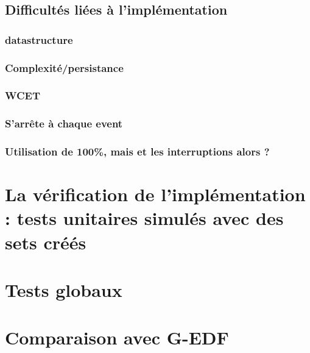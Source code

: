 		
		

\subsection{Difficultés liées à l'implémentation}
	\subsubsection{datastructure}
	\subsubsection{Complexité/persistance}
	\subsubsection{WCET}
	\subsubsection{S'arrête à chaque event}
	\subsubsection{Utilisation de 100\%, mais et les interruptions alors ?}

\section{La vérification de l'implémentation : tests unitaires simulés avec des sets créés}

\section{Tests globaux}

\section{Comparaison avec G-EDF}
